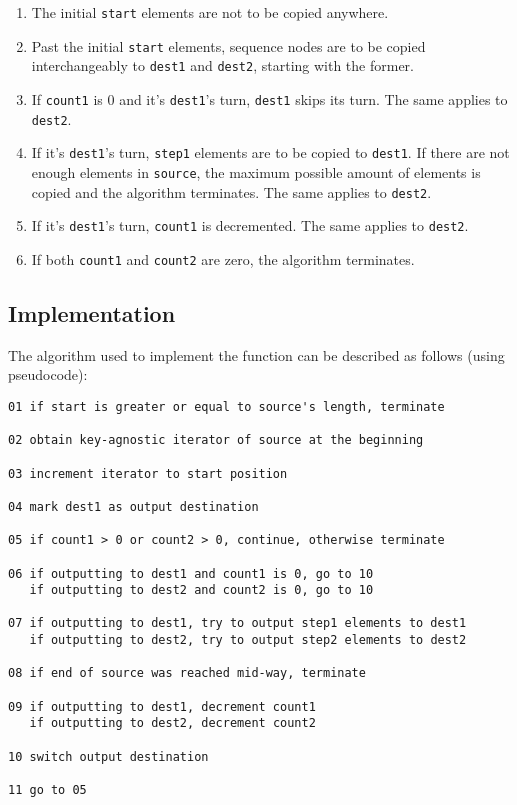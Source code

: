 ﻿\documentclass{article}
\begin{document}
\begin{enumerate}
\item The initial {\tt start} elements are not to be copied anywhere.

\item  Past the initial {\tt start} elements, sequence nodes are to be copied
interchangeably to {\tt dest1} and {\tt dest2}, starting with the former.

\item  If {\tt count1} is 0 and it's {\tt dest1}'s turn, {\tt dest1} skips its
turn. The same applies to {\tt dest2}.

\item  If it's {\tt dest1}'s turn, {\tt step1} elements are to be copied to
{\tt dest1}. If there are not enough elements in {\tt source}, the maximum
possible amount of elements is copied and the algorithm terminates.
The same applies to {\tt dest2}.

\item  If it's {\tt dest1}'s turn, {\tt count1} is decremented. The same applies
to {\tt dest2}.

\item If both {\tt count1} and {\tt count2} are zero, the algorithm terminates.
\end{enumerate}

\subsection{Implementation}

The algorithm used to implement the function can be described as follows
(using pseudocode):

\begin{verbatim}
01 if start is greater or equal to source's length, terminate

02 obtain key-agnostic iterator of source at the beginning

03 increment iterator to start position

04 mark dest1 as output destination

05 if count1 > 0 or count2 > 0, continue, otherwise terminate

06 if outputting to dest1 and count1 is 0, go to 10
   if outputting to dest2 and count2 is 0, go to 10
   
07 if outputting to dest1, try to output step1 elements to dest1
   if outputting to dest2, try to output step2 elements to dest2

08 if end of source was reached mid-way, terminate

09 if outputting to dest1, decrement count1
   if outputting to dest2, decrement count2

10 switch output destination

11 go to 05

\end{verbatim}
\end{document}
